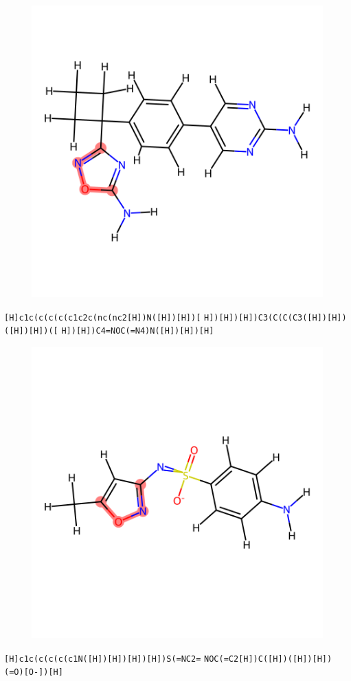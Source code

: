 \documentclass{article}
\begin{document}
\begin{figure}[ht]
\centering
    \includegraphics{mol246.png}
\end{figure}
\verb|[H]c1c(c(c(c(c1c2c(nc(nc2[H])N([H])[H])[| \verb|H])[H])[H])C3(C(C(C3([H])[H])([H])[H])([| \verb|H])[H])C4=NOC(=N4)N([H])[H])[H]|

\begin{figure}[ht]
\centering
    \includegraphics{mol247.png}
\end{figure}
\verb|[H]c1c(c(c(c(c1N([H])[H])[H])[H])S(=NC2=| \verb|NOC(=C2[H])C([H])([H])[H])(=O)[O-])[H]|
\end{document}
